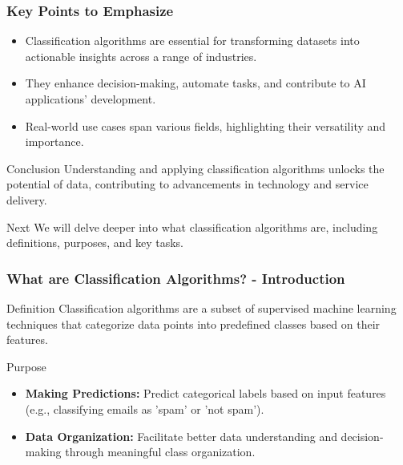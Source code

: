 \documentclass[aspectratio=169]{beamer}
\begin{document}
\begin{frame}[fragile]
    \frametitle{Key Points to Emphasize}
    \begin{itemize}
        \item Classification algorithms are essential for transforming datasets into actionable insights across a range of industries.
        \item They enhance decision-making, automate tasks, and contribute to AI applications' development.
        \item Real-world use cases span various fields, highlighting their versatility and importance.
    \end{itemize}
    
    \begin{block}{Conclusion}
        Understanding and applying classification algorithms unlocks the potential of data, contributing to advancements in technology and service delivery.
    \end{block}
    
    \begin{block}{Next}
        We will delve deeper into what classification algorithms are, including definitions, purposes, and key tasks.
    \end{block}
\end{frame}

\begin{frame}[fragile]
    \frametitle{What are Classification Algorithms? - Introduction}
    \begin{block}{Definition}
        Classification algorithms are a subset of supervised machine learning techniques that categorize data points into predefined classes based on their features. 
    \end{block}
    
    \begin{block}{Purpose}
        \begin{itemize}
            \item \textbf{Making Predictions:} Predict categorical labels based on input features (e.g., classifying emails as 'spam' or 'not spam').
            \item \textbf{Data Organization:} Facilitate better data understanding and decision-making through meaningful class organization.
        \end{itemize}
    \end{block}
\end{frame}
\end{document}
